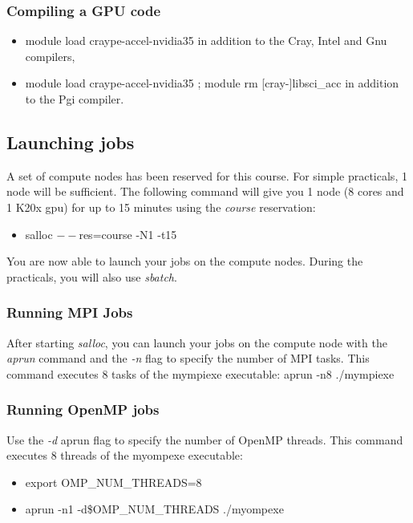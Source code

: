 \documentclass[a4paper,pagesize,12pt]{scrbook}
\begin{document}
\subsubsection*{Compiling a GPU code}
{\footnotesize \begin{itemize} 
\item \colorbox{mycolor}{module load craype-accel-nvidia35 } in addition to the Cray, Intel and Gnu compilers, 
\item \colorbox{mycolor}{module load craype-accel-nvidia35 ; module rm [cray-]libsci\_acc} in addition to the Pgi compiler.
\end{itemize} }


\subsection*{Launching jobs}
A set of compute nodes has been reserved for this course. For simple practicals, 1 node will be sufficient. The following command will give you 1 node (8 cores and 1 K20x gpu) for up to 15 minutes using the \emph{course} reservation:
{\footnotesize \begin{itemize} 
\item \colorbox{mycolor}{salloc $--$res=course -N1 -t15}
\end{itemize} }
You are now able to launch your jobs on the compute nodes. During the practicals, you will also use \emph{sbatch}.

\subsubsection*{Running MPI Jobs}
After starting \emph{salloc}, you can launch your jobs on the compute node with the \emph{aprun} command and the \emph{-n} flag to specify the number of MPI tasks.
This command executes 8 tasks of the mympiexe executable: \colorbox{mycolor}{aprun -n8 ./mympiexe}

\subsubsection*{Running OpenMP jobs}
Use the \emph{-d} aprun flag to specify the number of OpenMP threads. This command executes 8 threads of the myompexe executable:
{\footnotesize \begin{itemize} 
\item \colorbox{mycolor}{export OMP\_NUM\_THREADS=8}
\item \colorbox{mycolor}{aprun -n1 -d\$OMP\_NUM\_THREADS ./myompexe}
\end{itemize} }
\end{document}
